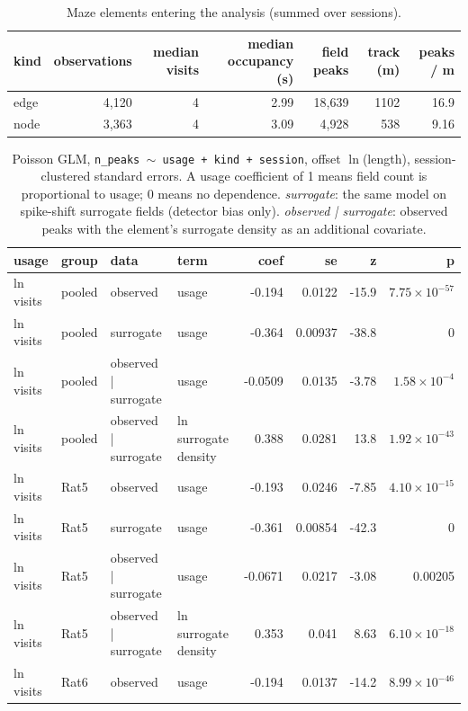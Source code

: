 \begin{table}[htbp]
\centering
\small
\caption{Maze elements entering the analysis (summed over sessions).}
\label{tab:field_density_usage:elements}
\begin{tabular}{lrrrrrr}
\toprule
kind & observations & median visits & median occupancy (s) & field peaks & track (m) & peaks / m \\
\midrule
edge & 4{,}120 & 4 & 2.99 & 18{,}639 & 1102 & 16.9 \\
node & 3{,}363 & 4 & 3.09 & 4{,}928 & 538 & 9.16 \\
\bottomrule
\end{tabular}
\end{table}
\begin{table}[htbp]
\centering
\footnotesize
\caption{Poisson GLM, \texttt{n\_peaks $\sim$ usage + kind + session}, offset $\ln$(length), session-clustered standard errors. A usage coefficient of 1 means field count is proportional to usage; 0 means no dependence. \emph{surrogate}: the same model on spike-shift surrogate fields (detector bias only). \emph{observed | surrogate}: observed peaks with the element's surrogate density as an additional covariate.}
\label{tab:field_density_usage:glm}
\begin{tabular}{llllrrrr}
\toprule
usage & group & data & term & coef & se & z & p \\
\midrule
ln visits & pooled & observed & usage & -0.194 & 0.0122 & -15.9 & $7.75\times10^{-57}$ \\
ln visits & pooled & surrogate & usage & -0.364 & 0.00937 & -38.8 & 0 \\
ln visits & pooled & observed | surrogate & usage & -0.0509 & 0.0135 & -3.78 & $1.58\times10^{-4}$ \\
ln visits & pooled & observed | surrogate & ln surrogate density & 0.388 & 0.0281 & 13.8 & $1.92\times10^{-43}$ \\
ln visits & Rat5 & observed & usage & -0.193 & 0.0246 & -7.85 & $4.10\times10^{-15}$ \\
ln visits & Rat5 & surrogate & usage & -0.361 & 0.00854 & -42.3 & 0 \\
ln visits & Rat5 & observed | surrogate & usage & -0.0671 & 0.0217 & -3.08 & 0.00205 \\
ln visits & Rat5 & observed | surrogate & ln surrogate density & 0.353 & 0.041 & 8.63 & $6.10\times10^{-18}$ \\
ln visits & Rat6 & observed & usage & -0.194 & 0.0137 & -14.2 & $8.99\times10^{-46}$ \\

\end{tabular}
\end{table}
